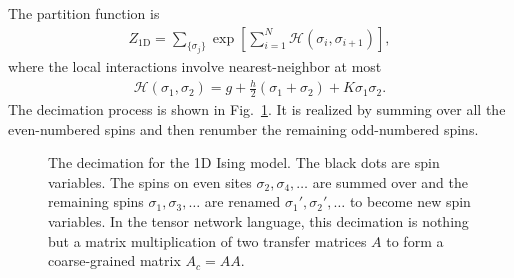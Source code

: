 \documentclass[aps,prr,reprint,superscriptaddress,floatfix]{revtex4-2}
\begin{document}
The partition function is
%
\begin{align}\label{def:Z4Ising1D}
    Z_{\text{1D}} = \sum_{\{\sigma_j \} } \exp{\left[\sum_{i=1}^N
    \mathscr{H}\left(\sigma_i,\sigma_{i+1}\right)  \right]},
\end{align}
%
where the local interactions involve nearest-neighbor at most
%
\begin{align}\label{def:H4Ising1D}
    \mathscr{H}\left(\sigma_1, \sigma_2\right) = g +
    \frac{h}{2}\left(\sigma_1 + \sigma_2\right) + K\sigma_1 \sigma_2.
\end{align}
%
The decimation process is shown in Fig.~\ref{fig:Ising1D-decimation}.
It is realized by summing over all the even-numbered spins and then
renumber the remaining odd-numbered spins. 
%
\begin{figure}[h]
    \caption{\label{fig:Ising1D-decimation}
        The decimation for the 1D Ising model. 
        The black dots are spin variables. 
        The spins on even sites $\sigma_2,\sigma_4,\ldots$ are summed over and the remaining spins $\sigma_1,\sigma_3,\ldots$ are renamed $\sigma_1',\sigma_2',\ldots$ to become new spin variables. 
        In the tensor network language, this decimation is nothing but a matrix multiplication of two transfer matrices $A$ to form a coarse-grained matrix $A_c = AA$.
    }
\end{figure}
%
\end{document}
